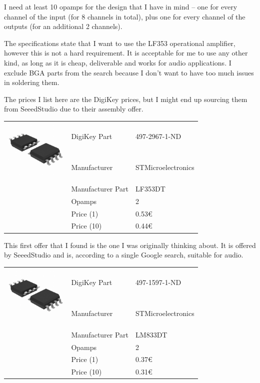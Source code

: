 \documentclass[a4paper]{article}
\begin{document}
I need at least 10 opamps for the design that I have in mind -- one for every channel of the input (for 8 channels in total), plus one for every channel of the outputs (for an additional 2 channels).

The specifications state that I want to use the LF353 operational amplifier, however this is not a hard requirement. It is acceptable for me to use any other kind, as long as it is cheap, deliverable and works for audio applications. I exclude BGA parts from the search because I don't want to have too much issues in soldering them.

The prices I list here are the DigiKey prices, but I might end up sourcing them from SeeedStudio due to their assembly offer. 

\begin{center}
\begin{tabular}{@{}p{3cm}p{3cm}p{3cm}@{}}
\multirow{2}{3cm}{\includegraphics[width=3cm]{images/soic8}}
& DigiKey Part & 497-2967-1-ND\\
& Manufacturer & STMicroelectronics\\
& Manufacturer Part & LF353DT\\
& Opamps & 2\\
& Price (1) & 0.53€\\
& Price (10) & 0.44€\\
\end{tabular}
\end{center}

This first offer that I found is the one I was originally thinking about. It is offered by SeeedStudio and is, according to a single Google search, suitable for audio.

\begin{center}
\begin{tabular}{@{}p{3cm}p{3cm}p{3cm}@{}}
\multirow{2}{3cm}{\includegraphics[width=3cm]{images/soic8}}
& DigiKey Part & 497-1597-1-ND\\
& Manufacturer & STMicroelectronics\\
& Manufacturer Part & LM833DT\\
& Opamps & 2\\
& Price (1) & 0.37€\\
& Price (10) & 0.31€\\
\end{tabular}
\end{center}
\end{document}
